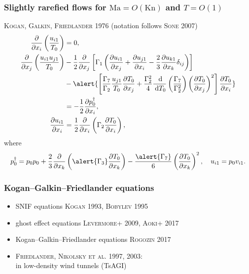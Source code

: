\documentclass[mathserif]{beamer} %
\newcommand{\Kn}{\mathrm{Kn}}
\newcommand{\Ma}{\mathrm{Ma}}
\newcommand{\dd}{\:\mathrm{d}}
\newcommand{\der}[2][]{\frac{\dd#1}{\dd#2}}
\newcommand{\pder}[2][]{\frac{\partial#1}{\partial#2}}
\newcommand{\OO}[1]{O(#1)}
\newcommand{\Cite}[2][]{\alert{\textsc{#2 #1}}}
\begin{document}
\begin{frame}
    \frametitle{Slightly rarefied flows for \(\Ma=\OO{\Kn}\) and \(T=\OO{1}\)}
    \Cite[1976]{Kogan, Galkin, Friedlander} (notation follows \Cite[2007]{Sone})
    \begin{align*}
        \pder{x_i}\left(\frac{u_{i1}}{T_0}\right) &= 0, \\
        \pder{x_j}\left(\frac{u_{i1}u_{j1}}{T_0}\right)
            &-\frac12\pder{x_j}\left[\Gamma_1\left(
                \pder[u_{i1}]{x_j} + \pder[u_{j1}]{x_i} - \frac23\pder[u_{k1}]{x_k}\delta_{ij}
            \right)\right] \\
            &-\alert{\left[
                \frac{\Gamma_7}{\Gamma_2}\frac{u_{j1}}{T_0}\pder[T_0]{x_j}
                + \frac{\Gamma_2^2}4 \der{T_0}\left(\frac{\Gamma_7}{\Gamma_2^2}\right)
                    \left(\pder[T_0]{x_j}\right)^2
            \right]\pder[T_0]{x_i}} \\
            &= -\frac12\pder[p_0^\dag]{x_i}, \\
        \pder[u_{i1}]{x_i} &= \frac12\pder{x_i}\left(\Gamma_2\pder[T_0]{x_i}\right),
    \end{align*}
    where
    \begin{equation*}
    p_0^\dag = p_0 p_0
        + \frac23\pder{x_k}\left(\alert{\Gamma_3}\pder[T_0]{x_k}\right)
        - \frac{\alert{\Gamma_7}}{6}\left(\pder[T_0]{x_k}\right)^2, \quad u_{i1} = p_0v_{i1}.
    \end{equation*}
\end{frame}

\begin{frame}
    \frametitle{Kogan--Galkin--Friedlander equations}
    \begin{itemize}
        \item SNIF equations \Cite[1993]{Kogan}, \Cite[1995]{Bobylev}
        \item ghost effect equations \Cite[2009]{Levermore+}, \Cite[2017]{Aoki+}
        \item Kogan--Galkin--Friedlander equations \Cite[2017]{Rogozin}
    \end{itemize}
    \vspace{10pt}

    \begin{itemize}
        \item \Cite[1997, 2003]{Friedlander, Nikolsky et al.}:\\
            in low-density wind tunnels (TsAGI)
    \end{itemize}
\end{frame}
\end{document}
